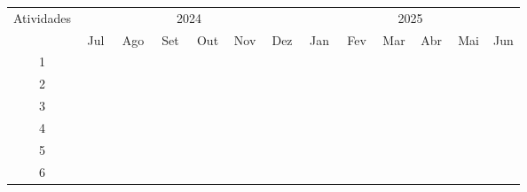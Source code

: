 \begin{center}


{\small \noindent
\begin{tabular}{|c|c|c|c|c|c|c|c|c|c|c|c|c|c|c|c|c|c|c|c|c|c|c|c|c|}
\hline
\multicolumn{1}{|c|}{\multirow{2}{*}{Atividades}} & \multicolumn{12}{c|}{2024} & \multicolumn{12}{c|}{2025} \\ \cline{2-25}
& \multicolumn{2}{c|}{Jul} & \multicolumn{2}{c|}{Ago} & \multicolumn{2}{c|}{Set} & \multicolumn{2}{c|}{Out} & \multicolumn{2}{c|}{Nov} & \multicolumn{2}{c|}{Dez} & \multicolumn{2}{c|}{Jan} & \multicolumn{2}{c|}{Fev} & \multicolumn{2}{c|}{Mar} & \multicolumn{2}{c|}{Abr} & \multicolumn{2}{c|}{Mai} & \multicolumn{2}{c|}{Jun} \\ \hline
1 & ~ & ~ & \cellcolor{black} & \cellcolor{black} & ~ & ~ & ~ & ~ & ~ & ~ & ~ & ~ & ~ & ~ & ~ & ~ & ~ & ~ & ~ & ~ & ~ & ~ & ~ & \\ \hline
2 & ~ & ~ & ~ & ~ & \cellcolor{black} & \cellcolor{black} & ~ & ~ & ~ & ~ & ~ & ~ & ~ & ~ & ~ & ~ & ~ & ~ & ~ & ~ & ~ & ~ & ~ & \\ \hline
3 & ~ & ~ & ~ & ~ & ~ & ~ & \cellcolor{black} & \cellcolor{black} & \cellcolor{black} & ~ & ~ & ~ & ~ & ~ & ~ & ~ & ~ & ~ & ~ & ~ & ~ & ~ & ~ & \\ \hline
4 & ~ & ~ & ~ & ~ & ~ & ~ & ~ & ~ & ~ & \cellcolor{black} & \cellcolor{black} & \cellcolor{black} & ~ & ~ & ~ & ~ & ~ & ~ & ~ & ~ & ~ & ~ & ~ & \\ \hline
5 & ~ & ~ & ~ & ~ & ~ & ~ & ~ & ~ & ~ & ~ & ~ & ~ & \cellcolor{black} & \cellcolor{black} & \cellcolor{black} & \cellcolor{black} & \cellcolor{black} & \cellcolor{black} & \cellcolor{black} & \cellcolor{black} & \cellcolor{black} & \cellcolor{black} & ~ & \\ \hline
6 & ~ & ~ & \cellcolor{black} & \cellcolor{black} & \cellcolor{black} & \cellcolor{black} & \cellcolor{black} & \cellcolor{black} & \cellcolor{black} & \cellcolor{black} & \cellcolor{black} & \cellcolor{black} & \cellcolor{black} & \cellcolor{black} & \cellcolor{black} & \cellcolor{black} & \cellcolor{black} & \cellcolor{black} & \cellcolor{black} & \cellcolor{black} & \cellcolor{black} & \cellcolor{black} & ~ & \\ \hline
\end{tabular}
}

\end{center}